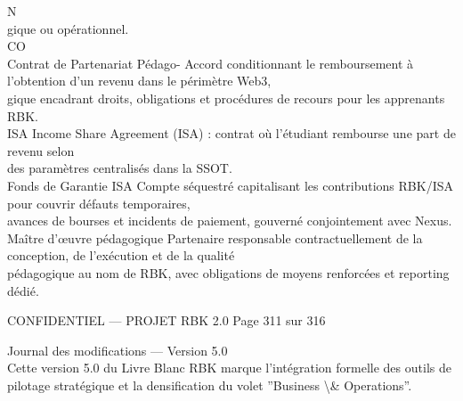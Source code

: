 \documentclass[12pt,landscape,a4paper]{article}
\newenvironment{confidential}
{\begin{tcolorbox}[
    colback=rbkred!5!white,
    colframe=rbkred!75!black,
    title=CONFIDENTIEL,
    fonttitle=\bfseries\color{white},
    coltitle=rbkred!75!black,
    breakable,
    enhanced,
    frame hidden,
    borderline west={2pt}{0pt}{rbkred!75!black}
]}
{\end{tcolorbox}}
\begin{document}
\vspace{0.5em}
\vspace{0.5em}
N\\
gique ou opérationnel.\\
CO\\
Contrat de Partenariat Pédago-              Accord conditionnant le remboursement à l’obtention d’un revenu dans le périmètre Web3,\\
gique                                       encadrant droits, obligations et procédures de recours pour les apprenants RBK.\\
\vspace{0.5em}
ISA                                         Income Share Agreement (ISA) : contrat où l’étudiant rembourse une part de revenu selon\\
des paramètres centralisés dans la SSOT.\\
\vspace{0.5em}
Fonds de Garantie ISA                       Compte séquestré capitalisant les contributions RBK/ISA pour couvrir défauts temporaires,\\
avances de bourses et incidents de paiement, gouverné conjointement avec Nexus.\\
\vspace{0.5em}
Maître d’œuvre pédagogique                  Partenaire responsable contractuellement de la conception, de l’exécution et de la qualité\\
pédagogique au nom de RBK, avec obligations de moyens renforcées et reporting dédié.\\
\vspace{0.5em}
\vspace{0.5em}
\vspace{0.5em}
\vspace{0.5em}
\begin{confidential}CONFIDENTIEL — PROJET RBK 2.0                        Page 311 sur 316\end{confidential}
Journal des modifications — Version 5.0\\
\vspace{0.5em}
\vspace{0.5em}
Cette version 5.0 du Livre Blanc RBK marque l’intégration formelle des outils de pilotage stratégique et la densification du volet ”Business \textbackslash{}& Operations”.\\
\vspace{0.5em}
\vspace{0.5em}
\vspace{0.5em}
\end{document}
